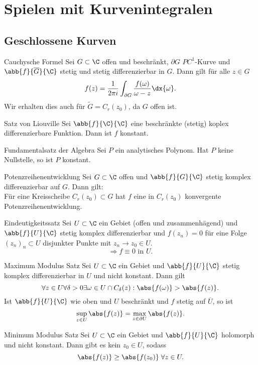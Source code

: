 \section{Spielen mit Kurvenintegralen}

\subsection{Geschlossene Kurven}

\begin{karte}{Cauchysche Formel}
    Sei \(G \subset \C\) offen und beschränkt, \(\partial G\) \(PC^1\)-Kurve und \(\abb{f}{\overline{G}}{\C}\) 
    stetig und stetig differenzierbar in \(G\). Dann gilt für alle \(z\in G\) 
    \[ f(z) = \frac{1}{2\pi i} \int_{\partial G} \frac{f(\omega)}{ \omega - z } \dx{\omega}. \]
    Wir erhalten dies auch für \( \tilde{G} = C_r(z_0)\), da \(G\) offen ist.
\end{karte}

\begin{karte}{Satz von Liouville}
    Sei \(\abb{f}{\C}{\C}\) eine beschränkte (stetig) koplex differenzierbare Funktion. 
    Dann ist \(f\) konstant.
\end{karte}

\begin{karte}{Fundamentalsatz der Algebra}
    Sei \(P\) ein analytisches Polynom. Hat \(P\) keine Nullstelle, so ist \(P\) konstant. 
\end{karte}

\begin{karte}{Potenzreihenentwicklung}
    Sei \(G\subset \C\) offen und \(\abb{f}{G}{\C}\) stetig komplex differenzierbar auf \(G\). Dann gilt:\\
    Für eine Kreisscheibe \(C_r(z_0) \subset G\) hat \(f\) eine in \(C_r(z_0)\) konvergente Potenzreihenentwicklung.
\end{karte}

\begin{karte}{Eindeutigkeitssatz}
    Sei \(U\subset \C\) ein Gebiet (offen und zusammenhägend) und \(\abb{f}{U}{\C}\) stetig komplex 
    differenzierbar und \(f(z_n) = 0\) für eine Folge \((z_n)_n \subset U\) disjunkter Punkte mit 
    \(z_n \rightarrow z_0 \in U\).
    \[ \Rightarrow f \equiv 0 \text{ in } U. \]
\end{karte}

\begin{karte}{Maximum Modulus Satz}
    Sei \(U\subset \C\) ein Gebiet und \(\abb{f}{U}{\C}\) stetig komplex differenzierbar in \(U\) und nicht konstant. 
    Dann gilt 
    \[ \forall z\in U \forall \delta>0 \exists \omega \in U \cap C_\delta(z) : \abs{f(\omega)} > \abs{f(z)}. \]
    Ist \(\abb{f}{U}{\C}\) wie oben und \(U\) beschränkt und \(f\) stetig auf \(\overline{U}\), so ist 
    \[ \sup_{z\in U} \abs{f(z)} = \max_{z\in \partial U} \abs{f(z)}. \]
\end{karte}

\begin{karte}{Minimum Modulus Satz}
    Sei \(U \subset \C\) ein Gebiet und \(\abb{f}{U}{\C}\) holomorph und nicht konstant. Dann gibt es kein 
    \(z_0 \in U\), sodass 
    \[ \abs{f(z)} \geq \abs{f(z_0)} \;\forall z\in U. \]
\end{karte}